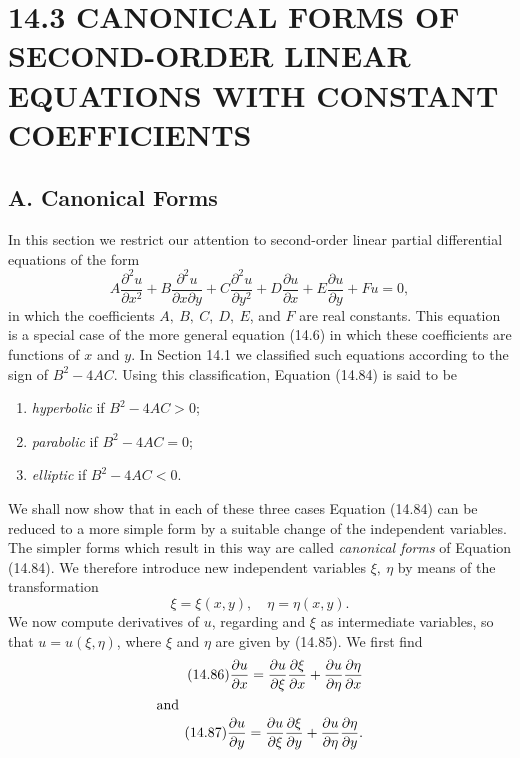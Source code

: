 \documentclass[11pt,a4paper, twoside]{report}
\begin{document}
  \section*{14.3 CANONICAL FORMS OF SECOND-ORDER LINEAR\\EQUATIONS WITH CONSTANT COEFFICIENTS}
	\subsection*{A. Canonical Forms}
	In this section we restrict our attention  to second-order  linear partial differential equations of the form
	\begin{equation}\tag{14.84}
		A\frac{\partial^2 u}{\partial x^2} + B\frac{\partial^2 u}{\partial x \partial y} + C\frac{\partial^2 u}{\partial y^2} + D \frac{\partial u}{\partial x} + E\frac{\partial u}{\partial y} + Fu = 0,
	\end{equation}
	in which the coefficients $A,\ B,\ C,\ D,\ E$, and $F$ are real constants. This equation is a special case of the more general equation (14.6) in which these coefficients are functions of $x$ and $y$. In Section 14.1 we classified such equations according to the sign of $B^2 - 4AC$. Using this classification, Equation (14.84) is said to be
	\begin{enumerate}
		\item \textit{hyperbolic} if $B^2 - 4AC > 0$;
		\item \textit{parabolic} if $B^2 - 4AC = 0$;
		\item \textit{elliptic} if $B^2 - 4AC < 0$.
	\end{enumerate}
	We shall now show that in each of these three cases Equation (14.84) can be reduced to a more simple form by a suitable change of the independent variables. The simpler forms which result in this way are called \textit{canonical forms} of Equation (14.84). We therefore introduce new independent variables $\xi,\ \eta$ by means of the transformation
	\begin{equation}
		\xi = \xi(x, y),\quad \eta = \eta(x, y).
	\end{equation}
	We now compute derivatives of $u$, regarding  and $\xi$ as intermediate variables, so that $u = u(\xi, \eta)$, where $\xi$ and $\eta$ are given by (14.85). We first find
	\begin{align}
		\tag{14.86}
		\frac{\partial u}{\partial x} = \frac{\partial u}{\partial \xi}\frac{\partial \xi}{\partial x} + \frac{\partial u}{\partial \eta}\frac{\partial \eta}{\partial x}\\
		\shortintertext{and}
		\tag{14.87}
		\frac{\partial u}{\partial y} = \frac{\partial u}{\partial \xi}\frac{\partial \xi}{\partial y} + \frac{\partial u}{\partial \eta}\frac{\partial \eta}{\partial y}.
	\end{align}
\end{document}
